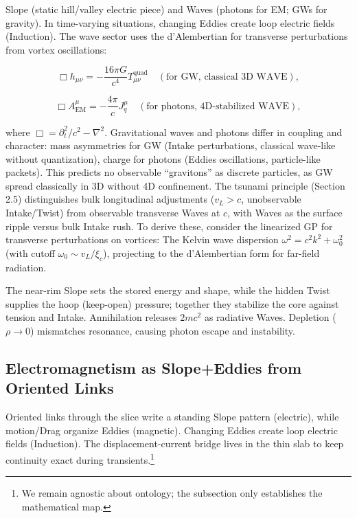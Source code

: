 Slope (static hill/valley electric piece) and Waves (photons for EM; GWs for gravity). In time-varying situations, changing Eddies create loop electric fields (Induction). The wave sector uses the d'Alembertian for transverse perturbations from vortex oscillations:

\begin{equation}
\Box h_{\mu\nu} = -\frac{16\pi G}{c^4} T_{\mu\nu}^{\text{quad}} \quad (\text{for GW, classical 3D WAVE}),
\end{equation}

\begin{equation}
\Box A^\mu_{\text{EM}} = -\frac{4\pi}{c} J_q^\mu \quad (\text{for photons, 4D-stabilized WAVE}),
\end{equation}

where $\Box = \partial_t^2 / c^2 - \nabla^2$. Gravitational waves and photons differ in coupling and character: mass asymmetries for GW (Intake perturbations, classical wave-like without quantization), charge for photons (Eddies oscillations, particle-like packets). This predicts no observable ``gravitons'' as discrete particles, as GW spread classically in 3D without 4D confinement. The tsunami principle (Section 2.5) distinguishes bulk longitudinal adjustments ($v_L > c$, unobservable Intake/Twist) from observable transverse Waves at $c$, with Waves as the surface ripple versus bulk Intake rush. To derive these, consider the linearized GP for transverse perturbations on vortices: The Kelvin wave dispersion $\omega^2 = c^2 k^2 + \omega_0^2$ (with cutoff $\omega_0 \sim v_L / \xi_c$), projecting to the d'Alembertian form for far-field radiation.

The near-rim Slope sets the stored energy and shape, while the hidden Twist supplies the hoop (keep-open) pressure; together they stabilize the core against tension and Intake. Annihilation releases $2mc^2$ as radiative Waves. Depletion ($\rho \to 0$) mismatches resonance, causing photon escape and instability.


\subsection{Electromagnetism as Slope+Eddies from Oriented Links}
\label{sec:EM-from-helical-vortices}

\begin{tcolorbox}[title=Plain-language snapshot (30 seconds)]
Oriented links through the slice write a standing Slope pattern (electric), while motion/Drag organize Eddies (magnetic). Changing Eddies create loop electric fields (Induction). The displacement-current bridge lives in the thin slab to keep continuity exact during transients.\footnote{We remain agnostic about ontology; the subsection only establishes the mathematical map.}
\end{tcolorbox}

